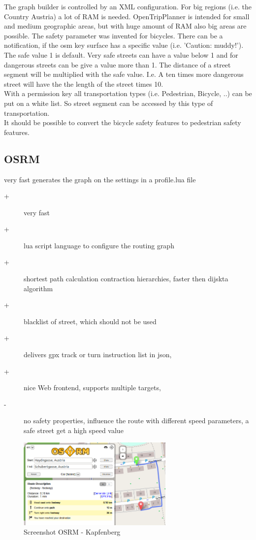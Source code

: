 \documentclass{sig-alternate}
\begin{document}
 The graph builder is controlled by an XML configuration. For big regions (i.e. the Country Austria) a lot of RAM is needed. OpenTripPlanner is intended for small and medium geographic areas, but with huge amount of RAM also big areas are possible. The safety parameter was invented for bicycles. There can be a notification, if the osm key surface  has a specific value (i.e. 'Caution: muddy!'). The safe value 1 is default. Very safe streets can have a value below 1 and for dangerous streets can be give a value more than 1. The distance of a street segment will be multiplied with the safe value. I.e. A ten times more dangerous street will have the the length of the street times 10. \\
 With a permission key all transportation types (i.e. Pedestrian, Bicycle, ..) can be put on a white list. So street segment can be accessed by this type of transportation. \\
 It should be possible to convert the bicycle safety features to pedestrian safety features.
 



\subsection{OSRM}
very fast\cite{luxen-vetter-2011} generates the graph on the settings in a profile.lua file
\begin{description}
\item[+]very fast
\item[+]lua script language to configure the routing graph 
\item[+]shortest path calculation contraction hierarchies, faster then dijskta algorithm
\item[+]blacklist of street, which should not be used
\item[+]delivers gpx track or turn instruction list in json,
\item[+]nice Web frontend, supports multiple targets,
\item[-] no safety properties, influence the route with different speed parameters, a safe street get a high speed value
\end{description}

\begin{figure}
\centering
\includegraphics[width=3in]{osrm-ss.png}
\caption{Screenshot OSRM - Kapfenberg}
\end{figure}
\end{document}
